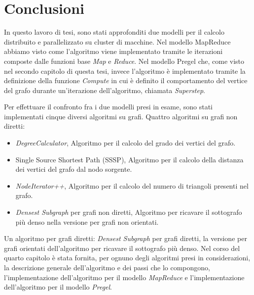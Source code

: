 \documentclass[LaM,binding=0.6cm]{sapthesis}
\begin{document}
\chapter{Conclusioni}


In questo lavoro di tesi, sono stati approfonditi due modelli per il calcolo distribuito e parallelizzato su cluster di macchine. Nel modello MapReduce \cite{Dean:2008:MSD:1327452.1327492} abbiamo visto come l'algoritmo viene implementato tramite le iterazioni composte dalle funzioni base \textit{Map} e \textit{Reduce}. Nel modello Pregel \cite{Malewicz:2010:PSL:1807167.1807184} che, come visto nel secondo capitolo di questa tesi, invece l'algoritmo è implementato tramite la definizione della funzione \textit{Compute} in cui è definito il comportamento del vertice del grafo durante un'iterazione dell'algoritmo, chiamata \textit{Superstep}.

Per effettuare il confronto fra i due modelli presi in esame, sono stati implementati cinque diversi algoritmi su grafi.
Quattro algoritmi su grafi non diretti:
\begin{itemize}
\item \textit{DegreeCalculator}, Algoritmo per il calcolo del grado dei vertici del grafo.
\item Single Source Shortest Path (SSSP), Algoritmo per il calcolo della distanza dei vertici del grafo dal nodo sorgente.
\item \textit{NodeIterator++}, Algoritmo per il calcolo del numero di triangoli presenti nel grafo.
\item \textit{Densest Subgraph }per grafi non diretti, Algoritmo per ricavare il sottografo più denso nella versione per grafi non orientati.
\end{itemize}
Un algoritmo per grafi diretti: \textit{Densest Subgraph }per grafi diretti, la versione per grafi orientati dell'algoritmo per ricavare il sottografo più denso.
Nel corso del quarto capitolo è stata fornita, per ognuno degli algoritmi presi in considerazioni, la descrizione generale dell'algoritmo e dei passi che lo compongono, l'implementazione dell'algoritmo per il modello \textit{MapReduce} e l'implementazione dell'algoritmo per il modello \textit{Pregel}.
\end{document}
